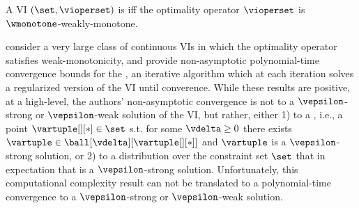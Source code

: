 
\begin{definition}\label{defn:weakly_monotone_VI}
    A VI $(\set, \vioperset)$ is  iff the optimality operator $\vioperset$ is $\wmonotone$-weakly-monotone. 
\end{definition} 

\citet{liu2021first} consider a very large class of continuous VIs in which the optimality operator satisfies weak-monotonicity, and provide non-asymptotic polynomial-time convergence bounds for the , an iterative algorithm which at each iteration solves a regularized version of the VI until converence. While these results are positive, at a high-level, the authors' non-asymptotic convergence is not to a $\vepsilon$-strong or $\vepsilon$-weak solution of the VI, but rather, either 1) to a , i.e., a point $\vartuple[][*] \in \set$ s.t. for some $\vdelta \geq 0$ there exists $\vartuple \in \ball[\vdelta][{\vartuple[][*]}]$ and $\vartuple$ is a $\vepsilon$-strong solution, or 2) to a distribution over the constraint set $\set$ that in expectation that is a $\vepsilon$-strong solution.
Unfortunately, this computational complexity result can not be translated to a polynomial-time convergence to a $\vepsilon$-strong or $\vepsilon$-weak solution. 
\fi 